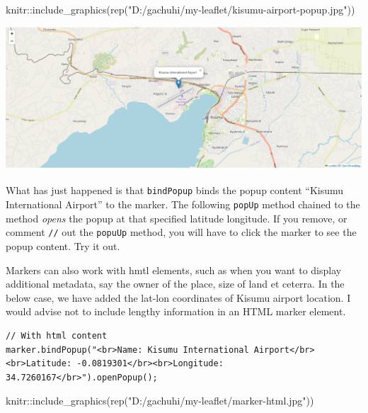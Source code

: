 \documentclass[
]{book}
\newenvironment{Shaded}{\begin{snugshade}}{\end{snugshade}}
\newcommand{\FunctionTok}[1]{\textcolor[rgb]{0.00,0.00,0.00}{#1}}
\newcommand{\NormalTok}[1]{#1}
\newcommand{\SpecialCharTok}[1]{\textcolor[rgb]{0.00,0.00,0.00}{#1}}
\newcommand{\StringTok}[1]{\textcolor[rgb]{0.31,0.60,0.02}{#1}}
\theoremstyle{definition}
\theoremstyle{definition}
\theoremstyle{definition}
\theoremstyle{definition}
\theoremstyle{remark}
\begin{document}
\begin{Shaded}
\begin{Highlighting}[]
\NormalTok{knitr}\SpecialCharTok{::}\FunctionTok{include\_graphics}\NormalTok{(}\FunctionTok{rep}\NormalTok{(}\StringTok{"D:/gachuhi/my{-}leaflet/kisumu{-}airport{-}popup.jpg"}\NormalTok{))}
\end{Highlighting}
\end{Shaded}

\includegraphics[width=26.43in]{../kisumu-airport-popup}

What has just happened is that \texttt{bindPopup} binds the popup content ``Kisumu International Airport'' to the marker. The following \texttt{popUp} method chained to the method \emph{opens} the popup at that specified latitude longitude. If you remove, or comment \texttt{//} out the \texttt{popuUp} method, you will have to click the marker to see the popup content. Try it out.

Markers can also work with hmtl elements, such as when you want to display additional metadata, say the owner of the place, size of land et ceterra. In the below case, we have added the lat-lon coordinates of Kisumu airport location. I would advise not to include lengthy information in an HTML marker element.

\begin{verbatim}
// With html content
marker.bindPopup("<br>Name: Kisumu International Airport</br><br>Latitude: -0.0819301</br><br>Longitude: 34.7260167</br>").openPopup();
\end{verbatim}

\begin{Shaded}
\begin{Highlighting}[]
\NormalTok{knitr}\SpecialCharTok{::}\FunctionTok{include\_graphics}\NormalTok{(}\FunctionTok{rep}\NormalTok{(}\StringTok{"D:/gachuhi/my{-}leaflet/marker{-}html.jpg"}\NormalTok{))}
\end{Highlighting}
\end{Shaded}
\end{document}
